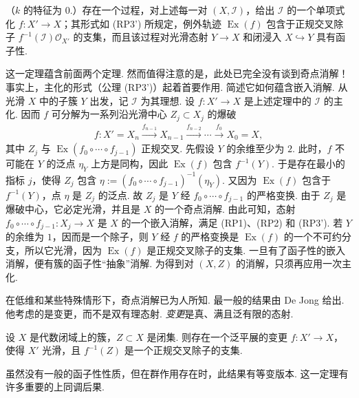 \begin{theorem}[Hironaka]\label{item:ag-4-1-13}
（$k$ 的特征为 $0$.）存在一个过程，对上述每一对 $(X,\mathcal I)$，给出 $\mathcal I$ 的一个单项式化 $f:X'\longrightarrow X$；其形式如 (RP3') 所规定，例外轨迹 $\operatorname{Ex}(f)$ 包含于正规交叉除子 $f^{-1}(\mathcal I)\mathcal O_{X'}$ 的支集，而且该过程对光滑态射 $Y\longrightarrow X$ 和闭浸入 $X\hookrightarrow Y$ 具有函子性.
\end{theorem}
这一定理蕴含前面两个定理. 然而值得注意的是，此处已完全没有谈到奇点消解！事实上，主化的形式（公理 (RP3')）起着首要作用.
简述它如何蕴含嵌入消解. 从光滑 $X$ 中的子簇 $Y$ 出发，记 $\mathcal I$ 为其理想. 设 $f:X'\longrightarrow X$ 是上述定理中的 $\mathcal I$ 的主化. 因而 $f$ 可分解为一系列沿光滑中心 $Z_j\subset X_j$ 的爆破
\begin{align*}
f:X'=X_n\xrightarrow{f_{n-1}}X_{n-1}\xrightarrow{f_{n-2}}\cdots\xrightarrow{f_0}X_0=X,
\end{align*}
其中 $Z_j$ 与 $\operatorname{Ex}(f_0\circ\cdots\circ f_{j-1})$ 正规交叉. 先假设 $Y$ 的余维至少为 $2$. 此时，$f$ 不可能在 $Y$ 的泛点 $\eta_Y$ 上方是同构，因此 $\operatorname{Ex}(f)$ 包含 $f^{-1}(Y)$. 于是存在最小的指标 $j$，使得 $Z_j$ 包含 $\eta:=(f_0\circ\cdots\circ f_{j-1})^{-1}(\eta_Y)$. 又因为 $\operatorname{Ex}(f)$ 包含于 $f^{-1}(Y)$，点 $\eta$ 是 $Z_j$ 的泛点. 故 $Z_j$ 是 $Y$ 经 $f_0\circ\cdots\circ f_{j-1}$ 的严格变换. 由于 $Z_j$ 是爆破中心，它必定光滑，并且是 $X$ 的一个奇点消解. 由此可知，态射 $f_0\circ\cdots\circ f_{j-1}:X_j\longrightarrow X$ 是 $X$ 的一个嵌入消解，满足 (RP1)、(RP2) 和 (RP3'). 若 $Y$ 的余维为 $1$，因而是一个除子，则 $Y$ 经 $f$ 的严格变换是 $\operatorname{Ex}(f)$ 的一个不可约分支，所以它光滑，因为 $\operatorname{Ex}(f)$ 是正规交叉除子的支集.
一旦有了函子性的嵌入消解，便有簇的函子性``抽象''消解. 为得到对 $(X,Z)$ 的消解，只须再应用一次主化.
\enlargethispage{3\baselineskip}
\begin{numpara}[如果特征为正]\label{item:ag-4-1-14}
在低维和某些特殊情形下，奇点消解已为人所知. 最一般的结果由 De Jong 给出. 他考虑的是变更，而不是双有理态射.
\emph{变更}是真、满且泛有限的态射.
\end{numpara}
\begin{theorem}[De Jong]\label{item:ag-4-1-15}
设 $X$ 是代数闭域上的簇，$Z\subset X$ 是闭集. 则存在一个泛平展的变更 $f:X'\longrightarrow X$，使得 $X'$ 光滑，且 $f^{-1}(Z)$ 是一个正规交叉除子的支集.
\end{theorem}
虽然没有一般的函子性性质，但在群作用存在时，此结果有等变版本. 这一定理有许多重要的上同调后果.
